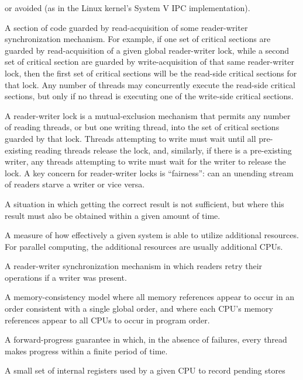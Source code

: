 \begin{description}
	or avoided (as in the Linux kernel's System V IPC implementation).
\item[\IXh{Read-Side}{Critical Section}:]
	A section of code guarded by read-acquisition of
	some reader-writer synchronization mechanism.
	For example, if one set of critical sections are guarded by
	read-acquisition of
	a given global reader-writer lock, while a second set of critical
	section are guarded by write-acquisition of that same reader-writer
	lock, then the first set of critical sections will be the
	read-side critical sections for that lock.
	Any number of threads may concurrently execute the read-side
	critical sections, but only if no thread is executing one of
	the write-side critical sections.
\item[\IXh{Reader-Writer}{Lock}:]
	A reader-writer lock is a mutual-exclusion mechanism that
	permits any number of reading
	threads, or but one writing thread, into the set of critical
	sections guarded by that lock.
	Threads attempting to write must wait until all pre-existing
	reading threads release the lock, and, similarly, if there
	is a pre-existing writer, any threads attempting to write must
	wait for the writer to release the lock.
	A key concern for reader-writer locks is ``fairness'':
	can an unending stream of readers starve a writer or vice versa.
\item[\IX{Real Time}:]
	A situation in which getting the correct result is not sufficient,
	but where this result must also be obtained within a given amount
	of time.
\item[\IX{Scalability}:]
	A measure of how effectively a given system is able to utilize
	additional resources.
	For parallel computing, the additional resources are usually
	additional CPUs.
\item[\IXh{Sequence}{Lock}:]
	A reader-writer synchronization mechanism in which readers
	retry their operations if a writer was present.
\item[\IXalthalt{Sequential Consistency}{sequential}{memory consistency}:]
	A memory-consistency model where all memory references appear to occur
	in an order consistent with
	a single global order, and where each CPU's memory references
	appear to all CPUs to occur in program order.
\item[\IX{Starvation Free}:]
	A forward-progress guarantee in which, in the absence of
	failures, every thread makes progress within a finite
	period of time.
\item[\IX{Store Buffer}:]
	A small set of internal registers used by a given CPU
	to record pending stores

\end{description}
